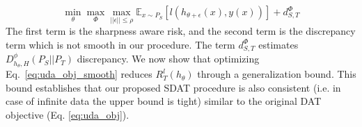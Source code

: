 \documentclass[table,dvipsnames]{article}
\theoremstyle{plain}
\theoremstyle{definition}
\theoremstyle{remark}
\begin{document}
\vspace{-2em}
\begin{equation}\min_{\theta} \max_{\Phi} \underset{||\epsilon|| \leq \rho}{\max}  \mathbb{E}_{x \sim P_S}[ l(h_{\theta + \epsilon}(x), y(x))] + d_{S,T}^{\Phi}
    \label{eq:uda_obj_smooth}
\end{equation}
The first term is the sharpness aware risk, and the second term is the discrepancy term which is not smooth in our procedure. The term $d_{S,T}^{\Phi}$ estimates $D_{h_{\theta}, H}^{\phi}(P_S||P_T)$ discrepancy. We now show that optimizing Eq.\ \ref{eq:uda_obj_smooth} reduces $R_T^l(h_\theta)$ through a generalization bound. {This bound establishes that our proposed SDAT procedure is also consistent (i.e. in case of infinite data the upper bound is tight) similar to the original DAT objective (Eq. \ref{eq:uda_obj})}.  
\end{document}
